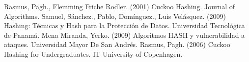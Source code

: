 \documentclass[final,a4paper,twocolumn,romanappendices]{IEEEtran}
\begin{document}
\begin{thebibliography}{}
\bibitem{}Rasmus, Pagh., Flemming Friche Rodler. (2001) Cuckoo Hashing. Journal of Algorithms.
\bibitem{}Samuel, Sánchez., Pablo, Domínguez., Luis Velásquez. (2009) Hashing: Técnicas y Hash para la
Protección de Datos. Universidad Tecnológica de Panamá.
\bibitem{}Mena Miranda, Yerko. (2009) Algoritmos HASH y vulnerabilidad a ataques. Universidad Mayor De San Andrés.
\bibitem{}Rasmus, Pagh. (2006) Cuckoo Hashing for Undergraduates. IT University of Copenhagen.



\end{thebibliography}
\end{document}
